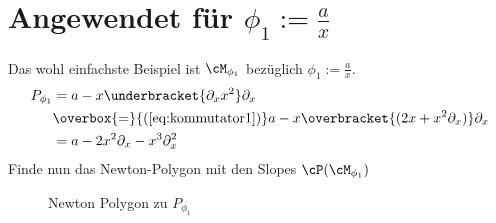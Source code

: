 \section{Angewendet für $\phi_1:=\frac{a}{x}$}
Das wohl einfachste Beispiel ist $\cM_{\phi_1}$ bezüglich
$\phi_1:=\frac{a}{x}$.
\begin{align*}
P_{\phi_1} &=a-x\underbracket{\partial_xx^2}\partial_x\\
           &\overbox{=}{(\ref{eq:kommutator1})}
             a-x\overbracket{(2x + x^2\partial_x)}\partial_x\\
           &=a-2x^2\partial_x - x^3\partial_x^2\\
\end{align*}
Finde nun das Newton-Polygon mit den Slopes $\cP(\cM_{\phi_1})$
\begin{figure}[H]
\caption{Newton Polygon zu $P_{\phi_1}$}
\begin{center}
\end{center}
\end{figure}

